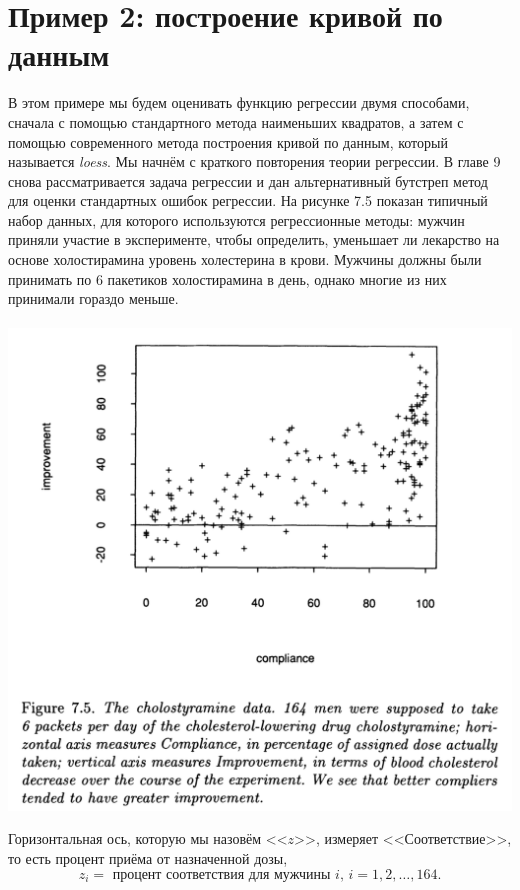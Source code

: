 \section{Пример 2: построение кривой по данным}

В этом примере мы будем оценивать функцию регрессии двумя способами, сначала с помощью стандартного метода наименьших квадратов, а затем с помощью современного метода построения кривой по данным, который называется \textit{loess}. Мы начнём с краткого повторения теории регрессии. В главе 9 снова рассматривается задача регрессии и дан альтернативный бутстреп метод для оценки стандартных ошибок регрессии. На рисунке 7.5 показан типичный набор данных, для которого используются регрессионные методы:  мужчин приняли участие в эксперименте, чтобы определить, уменьшает ли лекарство на основе холостирамина уровень холестерина в крови. Мужчины должны были принимать по 6 пакетиков холостирамина в день, однако многие из них принимали гораздо меньше.
\\~\\
\noindent
\includegraphics[width=0.9\linewidth]{6/f75.png}
\newline
\setcounter{figure}{1}

Горизонтальная ось, которую мы назовём <<$z$>>, измеряет <<Соответствие>>, то есть процент приёма от назначенной дозы,
$$
z_i = \text{ процент соответствия для мужчины } i,\, i = 1,2,\ldots, 164.
$$

